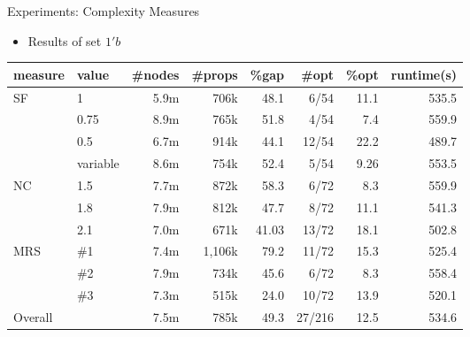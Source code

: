\documentclass{beamer}
\begin{document}
\begin{frame}{Experiments: Complexity Measures}
	\begin{itemize}
		\item Results of set $1'b$\pause
	\end{itemize}
	\begin{table}[H]
		\begin{adjustwidth}{-.9in}{-.9in}
			\centering
			\scriptsize
			\begin{tabular}{llrrrrrr}
				\toprule
				measure & value  & \#nodes & \#props & \%gap & \#opt & \%opt &  runtime(s) \\
				\midrule\midrule
				SF & 1 & 5.9m & 706k & 48.1 & 6/54 & 11.1 & 535.5 \\
				 & 0.75 & 8.9m & 765k & 51.8 & 4/54 & 7.4 & 559.9 \\
				 & 0.5 & 6.7m & 914k & 44.1 & 12/54 & 22.2 & 489.7 \\
				 & variable & 8.6m & 754k & 52.4 & 5/54 & 9.26 & 553.5 \\\midrule
				NC & 1.5 & 7.7m & 872k & 58.3 & 6/72 & 8.3 & 559.9 \\
				 & 1.8 & 7.9m & 812k & 47.7 & 8/72 & 11.1 & 541.3 \\
				 & 2.1 & 7.0m & 671k & 41.03 & 13/72 & 18.1 & 502.8 \\\midrule
				MRS & \#1 & 7.4m & 1,106k & 79.2 & 11/72 & 15.3 & 525.4 \\
				 & \#2 & 7.9m & 734k & 45.6 & 6/72 & 8.3 & 558.4 \\
				 & \#3 & 7.3m & 515k & 24.0 & 10/72 & 13.9 & 520.1 \\\midrule
				Overall &  & 7.5m & 785k & 49.3 & 27/216 & 12.5 & 534.6 \\\bottomrule
			\end{tabular}
		\end{adjustwidth}
	\end{table}
\end{frame}
\end{document}
